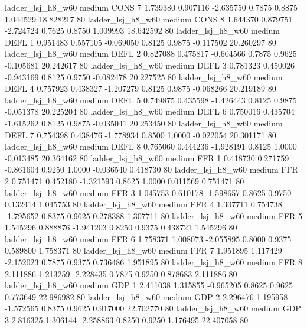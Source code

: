      ladder_lsj_h8_w60     medium     CONS                 7  1.739380 0.907116 -2.635750 0.7875 0.8875  1.044529   18.828217 80
     ladder_lsj_h8_w60     medium     CONS                 8  1.644370 0.879751 -2.724724 0.7625 0.8750  1.009993   18.642592 80
     ladder_lsj_h8_w60     medium     DEFL                 1  0.951483 0.557105 -0.069050 0.8125 0.9875 -0.117502   20.260297 80
     ladder_lsj_h8_w60     medium     DEFL                 2  0.827088 0.475817 -0.604566 0.7875 0.9625 -0.105681   20.242617 80
     ladder_lsj_h8_w60     medium     DEFL                 3  0.781323 0.450026 -0.943169 0.8125 0.9750 -0.082478   20.227525 80
     ladder_lsj_h8_w60     medium     DEFL                 4  0.757923 0.438327 -1.207279 0.8125 0.9875 -0.068266   20.219189 80
     ladder_lsj_h8_w60     medium     DEFL                 5  0.749875 0.435598 -1.426443 0.8125 0.9875 -0.051378   20.225204 80
     ladder_lsj_h8_w60     medium     DEFL                 6  0.750016 0.435704 -1.615262 0.8125 0.9875 -0.035041   20.253450 80
     ladder_lsj_h8_w60     medium     DEFL                 7  0.754398 0.438476 -1.778934 0.8500 1.0000 -0.022054   20.301171 80
     ladder_lsj_h8_w60     medium     DEFL                 8  0.765060 0.444236 -1.928191 0.8125 1.0000 -0.013485   20.364162 80
     ladder_lsj_h8_w60     medium      FFR                 1  0.418730 0.271759 -0.861604 0.9250 1.0000 -0.036540    0.418730 80
     ladder_lsj_h8_w60     medium      FFR                 2  0.751471 0.452180 -1.321593 0.8625 1.0000  0.011569    0.751471 80
     ladder_lsj_h8_w60     medium      FFR                 3  1.045753 0.610178 -1.598657 0.8625 0.9750  0.132414    1.045753 80
     ladder_lsj_h8_w60     medium      FFR                 4  1.307711 0.754738 -1.795652 0.8375 0.9625  0.278388    1.307711 80
     ladder_lsj_h8_w60     medium      FFR                 5  1.545296 0.888876 -1.941203 0.8250 0.9375  0.438721    1.545296 80
     ladder_lsj_h8_w60     medium      FFR                 6  1.758371 1.008073 -2.055895 0.8000 0.9375  0.589800    1.758371 80
     ladder_lsj_h8_w60     medium      FFR                 7  1.951895 1.117429 -2.152023 0.7875 0.9375  0.736486    1.951895 80
     ladder_lsj_h8_w60     medium      FFR                 8  2.111886 1.213259 -2.228435 0.7875 0.9250  0.878683    2.111886 80
     ladder_lsj_h8_w60     medium      GDP                 1  2.411038 1.315855 -0.965205 0.8625 0.9625  0.773649   22.986982 80
     ladder_lsj_h8_w60     medium      GDP                 2  2.296476 1.195958 -1.572565 0.8375 0.9625  0.917000   22.702770 80
     ladder_lsj_h8_w60     medium      GDP                 3  2.816325 1.306144 -2.258863 0.8250 0.9250  1.176495   22.407058 80
